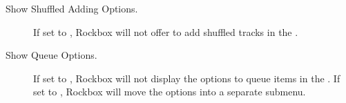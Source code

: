 \begin{description}
\begin{description}
  \item[Show Shuffled Adding Options.]
  If set to , Rockbox will not offer to add shuffled tracks
  in the .

  \item[Show Queue Options.]
  If set to , Rockbox will not display the options to queue items in
  the .
  If set to , Rockbox will move the options into a
  separate submenu.

  \end{description}

\end{description}

